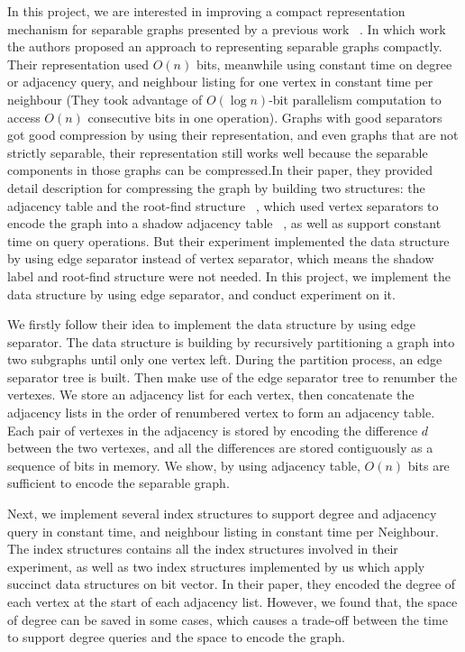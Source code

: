 \documentclass[12pt,glossary]{dalthesis}
\begin{document}
In this project, we are interested in improving a compact representation mechanism for separable graphs presented by a previous work ~\cite{compact-representation}. In which work the authors proposed an approach to representing separable graphs compactly. Their representation used $O(n)$ bits, meanwhile using constant time on degree or adjacency query, and neighbour listing for one vertex in constant time per neighbour (They took advantage of $O(\log n)$-bit parallelism computation to access $O(n)$ consecutive bits in one operation). Graphs with good separators got good compression by using their representation, and even graphs that are not strictly separable, their representation still works well because the separable components in those graphs can be compressed.In their paper, they provided detail description for compressing the graph by building two structures: the adjacency table and the root-find structure ~\cite{compact-representation}, which used vertex separators to encode the graph into a shadow adjacency table ~\cite{compact-representation}, as well as support constant time on query operations. But their experiment implemented the data structure by using edge separator instead of vertex separator, which means the shadow label and root-find structure were not needed. In this project, we implement the data structure by using edge separator, and conduct experiment on it.

\bigskip
\bigskip

We firstly follow their idea to implement the data structure by using edge separator. The data structure is building by recursively partitioning a graph into two subgraphs until only one vertex left. During the partition process, an edge separator tree is built. Then make use of the edge separator tree to renumber the vertexes. We store an adjacency list for each vertex, then concatenate the adjacency lists in the order of renumbered vertex to form an adjacency table. Each pair of vertexes in the adjacency is stored by encoding the difference $d$ between the two vertexes, and all the differences are stored contiguously as a sequence of bits in memory. We show, by using adjacency table, $O(n)$ bits are sufficient to encode the separable graph. 

\bigskip
\bigskip

Next, we implement several index structures to support degree and adjacency query in constant time, and neighbour listing in constant time per Neighbour. The index structures contains all the index structures involved in their experiment, as well as two index structures implemented by us which apply succinct data structures on bit vector. In their paper, they encoded the degree of each vertex at the start of each adjacency list. However, we found that, the space of degree can be saved in some cases, which causes a trade-off between the time to support degree queries and the space to encode the graph.
\end{document}
